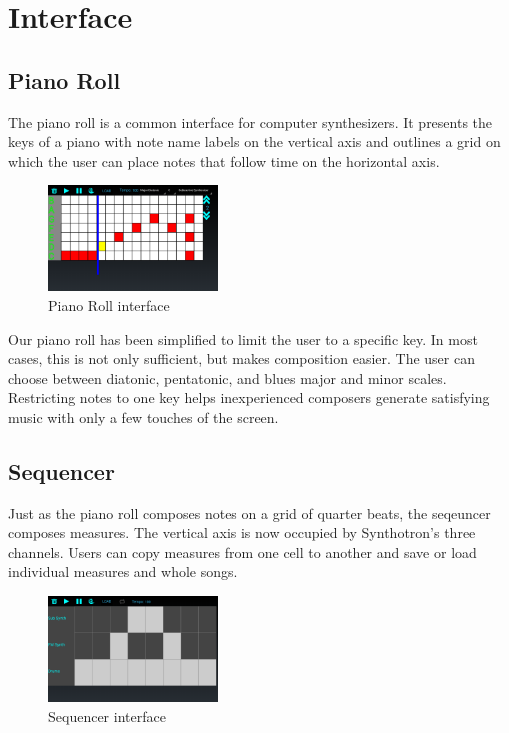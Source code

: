 \documentclass[letterpaper,12pt]{article}
\begin{document}
\section{Interface}

\subsection{Piano Roll}

The piano roll is a common interface for computer synthesizers. It  presents the keys of a piano with note name labels on the vertical axis and outlines a grid on which the user can place notes that follow time on the horizontal axis.

\begin{figure}[h]
\centering
\includegraphics[width=0.4\textwidth]{figures/pianoroll.png}
\caption{Piano Roll interface}
\label{fig:pianoroll}
\end{figure}

Our piano roll has been simplified to limit the user to a specific key. In most cases, this is not only sufficient, but makes composition easier. The user can choose between diatonic, pentatonic, and blues major and minor scales. Restricting notes to one key helps inexperienced composers generate satisfying music with only a few touches of the screen. 

\subsection{Sequencer}

Just as the piano roll composes notes on a grid of quarter beats, the seqeuncer composes measures. The vertical axis is now occupied by Synthotron's three channels. Users can copy measures from one cell to another and save or load individual measures and whole songs.

\begin{figure}[h]
\centering
\includegraphics[width=0.4\textwidth]{figures/sequencer.png}
\caption{Sequencer interface}
\label{fig:sequencer}
\end{figure}
\end{document}
